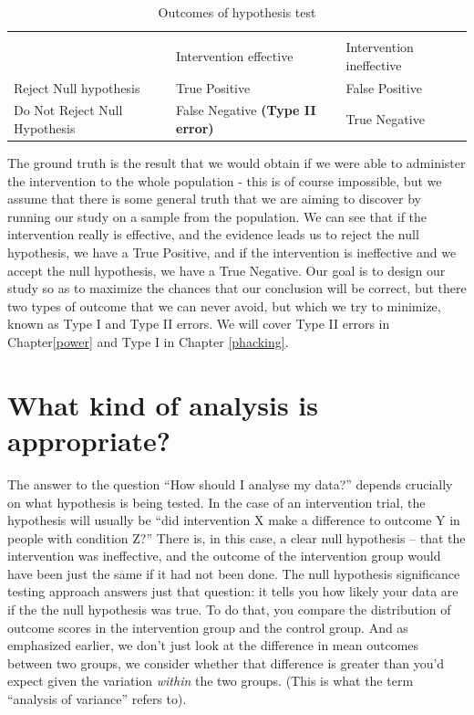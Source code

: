 \documentclass{krantz}
\begin{document}
\begin{table}

\caption{\label{tab:confusionMat}Outcomes of hypothesis test}
\centering
\begin{tabular}[t]{>{\centering\arraybackslash}p{9em}>{\centering\arraybackslash}p{9em}>{\centering\arraybackslash}p{9em}}
\toprule
\multicolumn{1}{c}{ } & \multicolumn{2}{c}{Ground truth} \\
\cmidrule(l{3pt}r{3pt}){2-3}
 & Intervention effective & Intervention ineffective\\
\midrule
Reject Null hypothesis & True Positive & False Positive 
\textbf{\cellcolor{gray!6}{ (Type I error)}}\\
Do Not Reject Null Hypothesis & False Negative 
\textbf{ (Type II error)} & True Negative\\
\bottomrule
\end{tabular}
\end{table}

The ground truth is the result that we would obtain if we were able to administer the intervention to the whole population - this is of course impossible, but we assume that there is some general truth that we are aiming to discover by running our study on a sample from the population. We can see that if the intervention really is effective, and the evidence leads us to reject the null hypothesis, we have a True Positive, and if the intervention is ineffective and we accept the null hypothesis, we have a True Negative. Our goal is to design our study so as to maximize the chances that our conclusion will be correct, but there two types of outcome that we can never avoid, but which we try to minimize, known as Type I and Type II errors. We will cover Type II errors in Chapter\ref{power} and Type I in Chapter \ref{phacking}.

\hypertarget{what-kind-of-analysis-is-appropriate}{%
\section{What kind of analysis is appropriate?}\label{what-kind-of-analysis-is-appropriate}}

The answer to the question ``How should I analyse my data?'' depends crucially on what hypothesis is being tested. In the case of an intervention trial, the hypothesis will usually be ``did intervention X make a difference to outcome Y in people with condition Z?'' There is, in this case, a clear null hypothesis -- that the intervention was ineffective, and the outcome of the intervention group would have been just the same if it had not been done. The null hypothesis significance testing approach answers just that question: it tells you how likely your data are if the the null hypothesis was true. To do that, you compare the distribution of outcome scores in the intervention group and the control group. And as emphasized earlier, we don't just look at the difference in mean outcomes between two groups, we consider whether that difference is greater than you'd expect given the variation \emph{within} the two groups. (This is what the term ``analysis of variance'' refers to).
\end{document}
